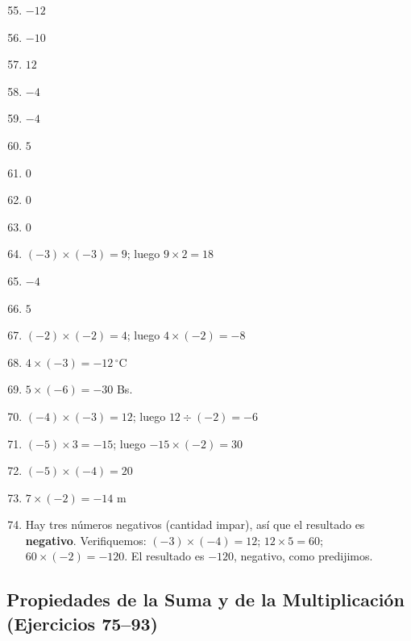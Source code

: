 \documentclass[12pt, letterpaper]{article}
\begin{document}
\begin{enumerate}[leftmargin=*, label=\textbf{\arabic*.}]
  \setcounter{enumi}{54}
  \item $-12$
  \item $-10$
  \item $12$
  \item $-4$
  \item $-4$
  \item $5$
  \item $0$
  \item $0$
  \item $0$
  \item $(-3) \times (-3) = 9$; luego $9 \times 2 = 18$
  \item $-4$
  \item $5$
  \item $(-2) \times (-2) = 4$; luego $4 \times (-2) = -8$
  \item $4 \times (-3) = -12\,^{\circ}$C
  \item $5 \times (-6) = -30$ Bs.
  \item $(-4) \times (-3) = 12$; luego $12 \div (-2) = -6$
  \item $(-5) \times 3 = -15$; luego $-15 \times (-2) = 30$
  \item $(-5) \times (-4) = 20$
  \item $7 \times (-2) = -14$ m
  \item Hay tres números negativos (cantidad impar), así que el resultado es \textbf{negativo}. Verifiquemos: $(-3) \times (-4) = 12$; $12 \times 5 = 60$; $60 \times (-2) = -120$. El resultado es $-120$, negativo, como predijimos.
\end{enumerate}

\subsection*{Propiedades de la Suma y de la Multiplicación (Ejercicios 75--93)}
\end{document}
